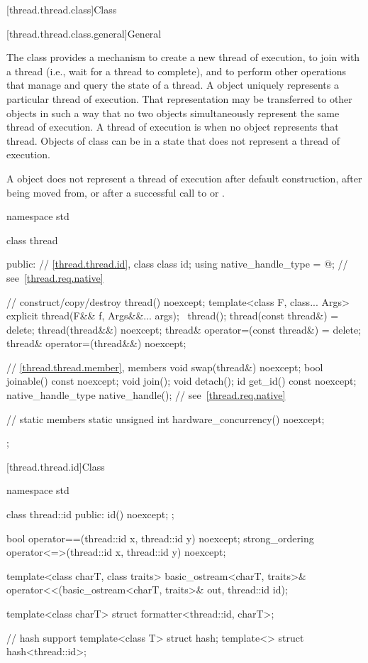 [thread.thread.class]{Class }

[thread.thread.class.general]{General}

\pnum
The class  provides a mechanism to create a new thread of execution, to join with
a thread (i.e., wait for a thread to complete), and to perform other operations that manage and
query the state of a thread. A  object uniquely represents a particular thread of
execution. That representation may be transferred to other  objects in such a way
that no two  objects simultaneously represent the same thread of execution. A
thread of execution is  when no  object represents that thread.
Objects of class  can be in a state that does not represent a thread of
execution.
\begin{note}
A  object does not represent a thread of execution after
default construction, after being moved from, or after a successful call to  or
.
\end{note}

%
\begin{codeblock}
namespace std {
  class thread {
  public:
    // \ref{thread.thread.id}, class 
    class id;
    using native_handle_type = @\impdefnc@;         // see~\ref{thread.req.native}

    // construct/copy/destroy
    thread() noexcept;
    template<class F, class... Args> explicit thread(F&& f, Args&&... args);
    ~thread();
    thread(const thread&) = delete;
    thread(thread&&) noexcept;
    thread& operator=(const thread&) = delete;
    thread& operator=(thread&&) noexcept;

    // \ref{thread.thread.member}, members
    void swap(thread&) noexcept;
    bool joinable() const noexcept;
    void join();
    void detach();
    id get_id() const noexcept;
    native_handle_type native_handle();                         // see~\ref{thread.req.native}

    // static members
    static unsigned int hardware_concurrency() noexcept;
  };
}
\end{codeblock}

[thread.thread.id]{Class }

%
%
\begin{codeblock}
namespace std {
  class thread::id {
  public:
    id() noexcept;
  };

  bool operator==(thread::id x, thread::id y) noexcept;
  strong_ordering operator<=>(thread::id x, thread::id y) noexcept;

  template<class charT, class traits>
    basic_ostream<charT, traits>&
      operator<<(basic_ostream<charT, traits>& out, thread::id id);

  template<class charT> struct formatter<thread::id, charT>;

  // hash support
  template<class T> struct hash;
  template<> struct hash<thread::id>;
}
\end{codeblock}

